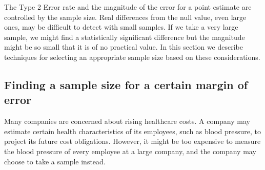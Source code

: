 The Type 2 Error rate and the magnitude of the error for a point estimate are controlled by the sample size. Real differences from the null value, even large ones, may be difficult to detect with small samples. If we take a very large sample, we might find a statistically significant difference but the magnitude might be so small that it is of no practical value. In this section we describe techniques for selecting an appropriate sample size based on these considerations.

\subsection{Finding a sample size for a certain margin of error}
\label{findingASampleSizeForACertainME}


Many companies are concerned about rising healthcare costs. A company may estimate certain health characteristics of its employees, such as blood pressure, to project its future cost obligations. However, it might be too expensive to measure the blood pressure of every employee at a large company, and the company may choose to take a sample instead.

